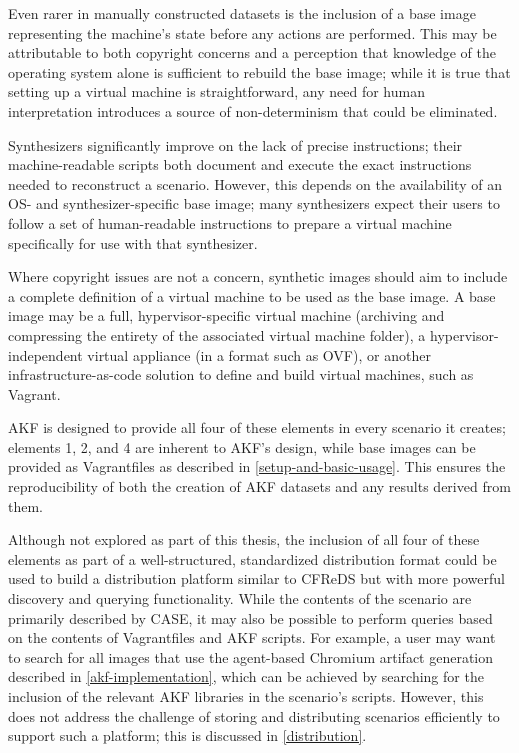 \documentclass[letterpaper,12pt]{report}
\begin{document}
Even rarer in manually constructed datasets is the inclusion of a base
image representing the machine's state before any actions are performed.
This may be attributable to both copyright concerns and a perception
that knowledge of the operating system alone is sufficient to rebuild
the base image; while it is true that setting up a virtual machine is
straightforward, any need for human interpretation introduces a source
of non-determinism that could be eliminated.

Synthesizers significantly improve on the lack of precise instructions;
their machine-readable scripts both document and execute the exact
instructions needed to reconstruct a scenario. However, this depends on
the availability of an OS- and synthesizer-specific base image; many
synthesizers expect their users to follow a set of human-readable
instructions to prepare a virtual machine specifically for use with that
synthesizer.

Where copyright issues are not a concern, synthetic images should aim to
include a complete definition of a virtual machine to be used as the
base image. A base image may be a full, hypervisor-specific virtual
machine (archiving and compressing the entirety of the associated
virtual machine folder), a hypervisor-independent virtual appliance (in
a format such as OVF), or another infrastructure-as-code solution to
define and build virtual machines, such as Vagrant.

AKF is designed to provide all four of these elements in every scenario
it creates; elements 1, 2, and 4 are inherent to AKF's design, while
base images can be provided as Vagrantfiles as described in \autoref{setup-and-basic-usage}. This ensures the
reproducibility of both the creation of AKF datasets and any results
derived from them.

Although not explored as part of this thesis, the inclusion of all four
of these elements as part of a well-structured, standardized
distribution format could be used to build a distribution platform
similar to CFReDS but with more powerful discovery and querying
functionality. While the contents of the scenario are primarily
described by CASE, it may also be possible to perform queries based on
the contents of Vagrantfiles and AKF scripts. For example, a user may
want to search for all images that use the agent-based Chromium artifact
generation described in \autoref{akf-implementation}, which can be achieved by searching for the inclusion of
the relevant AKF libraries in the scenario's scripts. However, this does
not address the challenge of storing and distributing scenarios
efficiently to support such a platform; this is discussed in
\autoref{distribution}.
\end{document}
